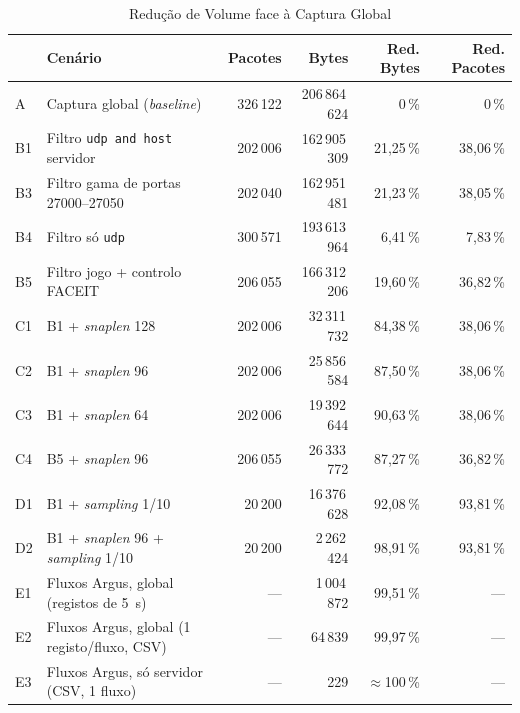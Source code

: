 \documentclass[11pt, a4paper]{article}
\begin{document}
\begin{table}[hbt!]
\centering
\small
\caption{Redução de Volume face à Captura Global}
\label{tab:red}
\begin{tabular}{@{} l >{\raggedright\arraybackslash}p{5.4cm} r r r r @{}}
\toprule
 & \textbf{Cenário} & \textbf{Pacotes} & \textbf{Bytes} & \textbf{Red. Bytes} & \textbf{Red. Pacotes} \\
\midrule
A  & Captura global (\textit{baseline})            & 326\,122 & 206\,864\,624 & 0\,\%     & 0\,\% \\
B1 & Filtro \texttt{udp and host} servidor         & 202\,006 & 162\,905\,309 & 21,25\,\% & 38,06\,\% \\
B3 & Filtro gama de portas 27000--27050            & 202\,040 & 162\,951\,481 & 21,23\,\% & 38,05\,\% \\
B4 & Filtro só \texttt{udp}                        & 300\,571 & 193\,613\,964 &  6,41\,\% &  7,83\,\% \\
B5 & Filtro jogo + controlo FACEIT                 & 206\,055 & 166\,312\,206 & 19,60\,\% & 36,82\,\% \\
\addlinespace
C1 & B1 + \textit{snaplen} 128                     & 202\,006 &  32\,311\,732 & 84,38\,\% & 38,06\,\% \\
C2 & B1 + \textit{snaplen} 96                      & 202\,006 &  25\,856\,584 & 87,50\,\% & 38,06\,\% \\
C3 & B1 + \textit{snaplen} 64                      & 202\,006 &  19\,392\,644 & 90,63\,\% & 38,06\,\% \\
C4 & B5 + \textit{snaplen} 96                      & 206\,055 &  26\,333\,772 & 87,27\,\% & 36,82\,\% \\
\addlinespace
D1 & B1 + \textit{sampling} 1/10                   &  20\,200 &  16\,376\,628 & 92,08\,\% & 93,81\,\% \\
D2 & B1 + \textit{snaplen} 96 + \textit{sampling} 1/10 & 20\,200 & 2\,262\,424 & 98,91\,\% & 93,81\,\% \\
\addlinespace
E1 & Fluxos Argus, global (registos de 5~s)        & --- &   1\,004\,872 & 99,51\,\% & --- \\
E2 & Fluxos Argus, global (1 registo/fluxo, CSV)   & --- &      64\,839 & 99,97\,\% & --- \\
E3 & Fluxos Argus, só servidor (CSV, 1 fluxo)      & --- &         229 & $\approx$100\,\% & --- \\
\bottomrule
\end{tabular}
\end{table}
\end{document}
